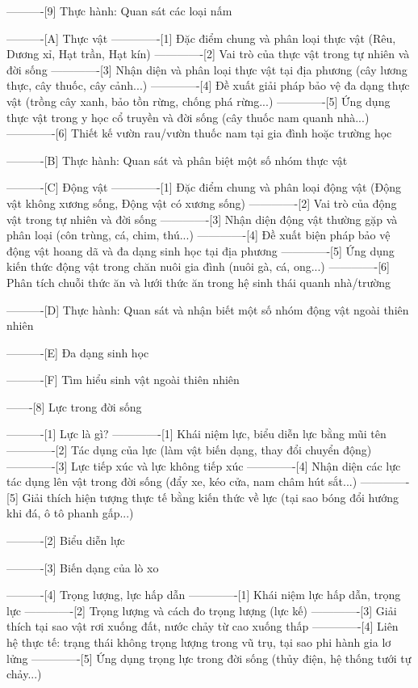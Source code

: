 ----------[9] Thực hành: Quan sát các loại nấm

----------[A] Thực vật
-------------[1] Đặc điểm chung và phân loại thực vật (Rêu, Dương xỉ, Hạt trần, Hạt kín)
-------------[2] Vai trò của thực vật trong tự nhiên và đời sống
-------------[3] Nhận diện và phân loại thực vật tại địa phương (cây lương thực, cây thuốc, cây cảnh...)
-------------[4] Đề xuất giải pháp bảo vệ đa dạng thực vật (trồng cây xanh, bảo tồn rừng, chống phá rừng...)
-------------[5] Ứng dụng thực vật trong y học cổ truyền và đời sống (cây thuốc nam quanh nhà...)
-------------[6] Thiết kế vườn rau/vườn thuốc nam tại gia đình hoặc trường học

----------[B] Thực hành: Quan sát và phân biệt một số nhóm thực vật

----------[C] Động vật
-------------[1] Đặc điểm chung và phân loại động vật (Động vật không xương sống, Động vật có xương sống)
-------------[2] Vai trò của động vật trong tự nhiên và đời sống
-------------[3] Nhận diện động vật thường gặp và phân loại (côn trùng, cá, chim, thú...)
-------------[4] Đề xuất biện pháp bảo vệ động vật hoang dã và đa dạng sinh học tại địa phương
-------------[5] Ứng dụng kiến thức động vật trong chăn nuôi gia đình (nuôi gà, cá, ong...)
-------------[6] Phân tích chuỗi thức ăn và lưới thức ăn trong hệ sinh thái quanh nhà/trường

----------[D] Thực hành: Quan sát và nhận biết một số nhóm động vật ngoài thiên nhiên

----------[E] Đa dạng sinh học

----------[F] Tìm hiểu sinh vật ngoài thiên nhiên

-------[8] Lực trong đời sống

----------[1] Lực là gì?
-------------[1] Khái niệm lực, biểu diễn lực bằng mũi tên
-------------[2] Tác dụng của lực (làm vật biến dạng, thay đổi chuyển động)
-------------[3] Lực tiếp xúc và lực không tiếp xúc
-------------[4] Nhận diện các lực tác dụng lên vật trong đời sống (đẩy xe, kéo cửa, nam châm hút sắt...)
-------------[5] Giải thích hiện tượng thực tế bằng kiến thức về lực (tại sao bóng đổi hướng khi đá, ô tô phanh gấp...)

----------[2] Biểu diễn lực

----------[3] Biến dạng của lò xo

----------[4] Trọng lượng, lực hấp dẫn
-------------[1] Khái niệm lực hấp dẫn, trọng lực
-------------[2] Trọng lượng và cách đo trọng lượng (lực kế)
-------------[3] Giải thích tại sao vật rơi xuống đất, nước chảy từ cao xuống thấp
-------------[4] Liên hệ thực tế: trạng thái không trọng lượng trong vũ trụ, tại sao phi hành gia lơ lửng
-------------[5] Ứng dụng trọng lực trong đời sống (thủy điện, hệ thống tưới tự chảy...)

